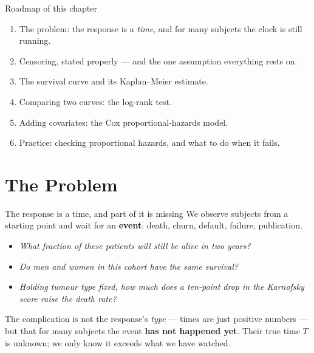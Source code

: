 \documentclass[aspectratio=169,11pt]{beamer}
\begin{document}
\begin{frame}{Roadmap of this chapter}
  \begin{takeaway}
    \begin{enumerate}
      \item The problem: the response is a \emph{time}, and for many subjects the
            clock is still running.
      \item Censoring, stated properly --- and the one assumption everything rests on.
      \item The survival curve and its Kaplan--Meier estimate.
      \item Comparing two curves: the log-rank test.
      \item Adding covariates: the Cox proportional-hazards model.
      \item Practice: checking proportional hazards, and what to do when it fails.
    \end{enumerate}
  \end{takeaway}
\end{frame}


\section{The Problem}

\begin{frame}{The response is a time, and part of it is missing}
  We observe subjects from a starting point and wait for an \textbf{event}: death,
  churn, default, failure, publication.
  \begin{readme}
    \begin{itemize}
      \item \emph{What fraction of these patients will still be alive in two years?}
      \item \emph{Do men and women in this cohort have the same survival?}
      \item \emph{Holding tumour type fixed, how much does a ten-point drop in the
            Karnofsky score raise the death rate?}
    \end{itemize}
  \end{readme}
  \begin{takeaway}
    The complication is not the response's \emph{type} --- times are just positive
    numbers --- but that for many subjects the event \textbf{has not happened yet}.
    Their true time $T$ is unknown; we only know it exceeds what we have watched.
  \end{takeaway}
\end{frame}
\end{document}
